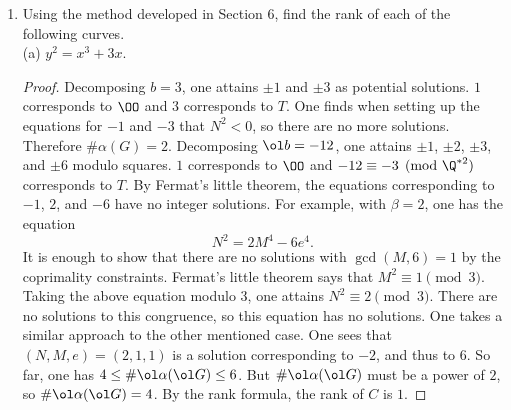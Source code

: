 \documentclass[11pt, oneside]{article}
\begin{document}
\begin{enumerate}
\begin{proof}
$$$$ 
One determines the orders of $\alpha(C(\Q))$ and $\ol\alpha( \ol{C(\Q)})$ by considering all of the integer factors of $b$ (and $\ol b$) modulo rational squares. For instance, if $b=4$, then this set would be $\{\pm1, \pm2\}$. For each value $\beta$ in this set, one sees if
$$
N^2 = \beta M^4 + a M^2e^2 + (b/\beta)e^4
$$
has a solution in the integers with $M\neq 0$, $\gcd(M,e) = \gcd (N, e) = \gcd (\beta,e)=1$, and, assuming $\gcd(b/\beta,M)=1$, $\gcd(b/\beta, M) = \gcd(M,N) = 1$. If it does, then it corresponds to an element in $\alpha(C(\Q))$ whose coordinates depend on $b$, $M$, $N$, and $e$ in the following way:
$$
x = \frac{bM^2}{e^2},\quad y = \frac{bMN}{e^3}.
$$ 
With this algorithm in mind, one takes $b=p$ and $\ol b = -4p$. The relevant factors of $b$ are $\pm 1$ and $\pm p$, and out of the four equations that arise, only two of them may have solutions, so $\#\alpha \le  2 $. The relevant factors of $\ol b$ are $\pm 1$, $\pm 2$, $\pm p$, and $\pm 2p$ after modding out by squares. $8$ equations arise, and all of them may have a solution. So $\#\ol\alpha( \ol{C(\Q)}) \le  8$. Taking the maximum values for each, one determines that $r=2$, so $r\le  2$. One needs to show that each $r$ occurs.
\end{proof}
%
%
\item Using the method developed in Section 6, find the rank of each of the following curves.\\
(a) \qquad$y^2 = x^3+3x$.
\begin{proof}
Decomposing $b=3$, one attains $\pm 1$ and $\pm 3$ as potential solutions. $1$ corresponds to $\OO$ and $3$ corresponds to $T$. One finds when setting up the equations for $-1$ and $-3$ that $N^2<0$, so there are no more solutions. Therefore $\#\alpha(G) = 2$. Decomposing $\ol b = -12$, one attains $\pm 1$, $\pm 2$, $\pm 3$, and $\pm 6$ modulo squares.  $1$ corresponds to $\OO$ and $-12 \equiv -3\pmod{\Q^{*2}}$ corresponds to $T$. By Fermat's little theorem, the equations corresponding to $-1$, $2$, and $-6$ have no integer solutions. For example, with $\beta=2$, one has the equation
$$
N^2 = 2M^4 - 6e^4.
$$
It is enough to show that there are no solutions with $\gcd(M, 6)=1$ by the coprimality constraints. Fermat's little theorem says that $M^2 \equiv 1\pmod 3$. Taking the above equation modulo $3$, one attains $N^2 \equiv 2\pmod 3$. There are no solutions to this congruence, so this equation has no solutions. One takes a similar approach to the other mentioned case. One sees that $(N,M,e) = (2,1,1)$ is a solution corresponding to $-2$, and thus to $6$. So far, one has $4\le  \#\ol\alpha(\ol G) \le  6$. But $\#\ol\alpha(\ol G)$ must be a power of $2$, so $\#\ol\alpha(\ol G) = 4$. By the rank formula, the rank of $C$ is $1$.

\end{proof}
\end{enumerate}
\end{document}
